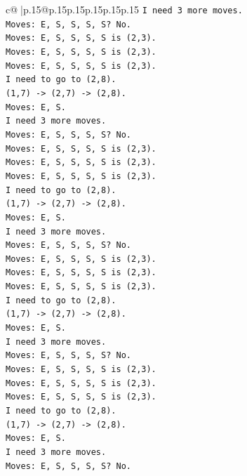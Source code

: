 \documentclass{article}
\begin{document}
{\begin{supertabular}{c@{$\;$}|p{.15\linewidth}@{}p{.15\linewidth}p{.15\linewidth}p{.15\linewidth}p{.15\linewidth}p{.15\linewidth}}
{{{\texttt{I need 3 more moves.} \\
\texttt{Moves: E, S, S, S, S? No.} \\
\texttt{Moves: E, S, S, S, S is (2,3).} \\
\texttt{Moves: E, S, S, S, S is (2,3).} \\
\texttt{Moves: E, S, S, S, S is (2,3).} \\
\texttt{I need to go to (2,8).} \\
\texttt{(1,7) {-}> (2,7) {-}> (2,8).} \\
\texttt{Moves: E, S.} \\
\texttt{I need 3 more moves.} \\
\texttt{Moves: E, S, S, S, S? No.} \\
\texttt{Moves: E, S, S, S, S is (2,3).} \\
\texttt{Moves: E, S, S, S, S is (2,3).} \\
\texttt{Moves: E, S, S, S, S is (2,3).} \\
\texttt{I need to go to (2,8).} \\
\texttt{(1,7) {-}> (2,7) {-}> (2,8).} \\
\texttt{Moves: E, S.} \\
\texttt{I need 3 more moves.} \\
\texttt{Moves: E, S, S, S, S? No.} \\
\texttt{Moves: E, S, S, S, S is (2,3).} \\
\texttt{Moves: E, S, S, S, S is (2,3).} \\
\texttt{Moves: E, S, S, S, S is (2,3).} \\
\texttt{I need to go to (2,8).} \\
\texttt{(1,7) {-}> (2,7) {-}> (2,8).} \\
\texttt{Moves: E, S.} \\
\texttt{I need 3 more moves.} \\
\texttt{Moves: E, S, S, S, S? No.} \\
\texttt{Moves: E, S, S, S, S is (2,3).} \\
\texttt{Moves: E, S, S, S, S is (2,3).} \\
\texttt{Moves: E, S, S, S, S is (2,3).} \\
\texttt{I need to go to (2,8).} \\
\texttt{(1,7) {-}> (2,7) {-}> (2,8).} \\
\texttt{Moves: E, S.} \\
\texttt{I need 3 more moves.} \\
\texttt{Moves: E, S, S, S, S? No.} \\
}}}
\end{supertabular}}
\end{document}
